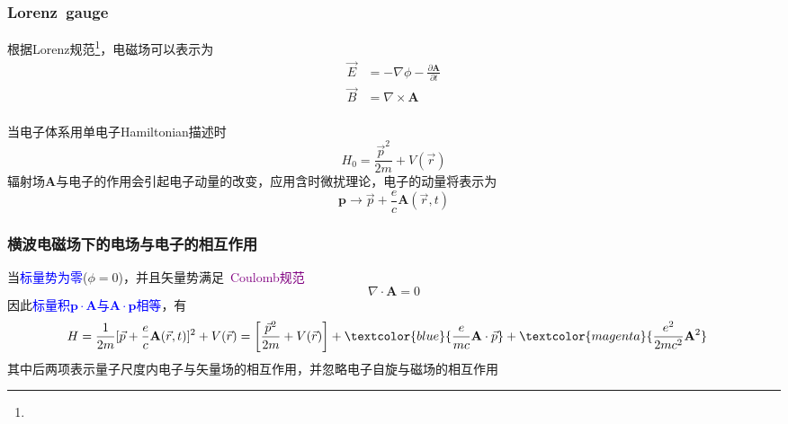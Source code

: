 {\frame
{
	\frametitle{\textrm{Lorenz~gauge}}
	根据\textrm{Lorenz}规范\footnote{\fontsize{4.8pt}{4.0pt}}，电磁场可以表示为
\begin{displaymath}
\begin{aligned}
	\vec E&=-\nabla\phi-\frac{\partial\mathbf{A}}{\partial t}\\
	\vec B&=\nabla\times\mathbf{A}
  \end{aligned}%
  \label{eq:optic-26}
\end{displaymath}
{\fontsize{8.2pt}{4.0pt}}\\
当电子体系用单电子\textrm{Hamiltonian}描述时
\begin{displaymath}
	H_0=\frac{{\vec p}^2}{2m}+V(\vec r)
\end{displaymath}
辐射场$\mathbf{A}$与电子的作用会引起电子动量的改变，应用含时微扰理论，电子的动量将表示为
	\begin{displaymath}
		\mathbf{p}\rightarrow\vec p+\frac{e}{c}\mathbf{A}(\vec r,t)
	\end{displaymath}
}

\frame
{
	\frametitle{横波电磁场下的电场与电子的相互作用}
	当\textcolor{blue}{标量势为零}($\phi=0$)，并且矢量势满足~\textcolor{purple}{\textrm{Coulomb}规范}
	\begin{displaymath}
		\nabla\cdot\mathbf{A}=0
	\end{displaymath}
	因此\textcolor{blue}{标量积$\mathbf{p}\cdot\mathbf{A}$与$\mathbf{A}\cdot\mathbf{p}$相等}，有
\begin{displaymath}
	\hspace*{-10pt}
	H=\frac1{2m}[\vec p+\frac{e}c\mathbf{A}(\vec r,t)]^2+V(\vec r)=\left[ \frac{\vec p^2}{2m}+V(\vec r) \right]+\textcolor{blue}{\frac{e}{mc}\mathbf{A}\cdot\vec p}+\textcolor{magenta}{\frac{e^2}{2mc^2}\mathbf{A}^2}
\end{displaymath}
其中后两项表示量子尺度内电子与矢量场的相互作用，并忽略电子自旋与磁场的相互作用

}}
